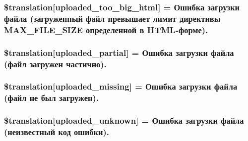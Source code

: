 \subsubsection[{\$translation}]{\setlength{\rightskip}{0pt plus 5cm}\$translation\mbox{[}\textquotesingle{}uploaded\+\_\+too\+\_\+big\+\_\+html\textquotesingle{}\mbox{]} = \textquotesingle{}Ошибка загрузки файла (загруженный файл превышает лимит директивы M\+A\+X\+\_\+\+F\+I\+L\+E\+\_\+\+S\+I\+Z\+E определенной в H\+T\+M\+L-\/форме).\textquotesingle{}}\label{class_8upload_8ru___r_u_8php_a623d5b8b92169f57d7e43458aa911cbb}
\hypertarget{class_8upload_8ru___r_u_8php_a967c17da21b0a2d3bd65cca3a9ca0ea8}{}
\subsubsection[{\$translation}]{\setlength{\rightskip}{0pt plus 5cm}\$translation\mbox{[}\textquotesingle{}uploaded\+\_\+partial\textquotesingle{}\mbox{]} = \textquotesingle{}Ошибка загрузки файла (файл загружен частично).\textquotesingle{}}\label{class_8upload_8ru___r_u_8php_a967c17da21b0a2d3bd65cca3a9ca0ea8}
\hypertarget{class_8upload_8ru___r_u_8php_a0cce433260be65f1f35853a6b4b8952b}{}
\subsubsection[{\$translation}]{\setlength{\rightskip}{0pt plus 5cm}\$translation\mbox{[}\textquotesingle{}uploaded\+\_\+missing\textquotesingle{}\mbox{]} = \textquotesingle{}Ошибка загрузки файла (файл не был загружен).\textquotesingle{}}\label{class_8upload_8ru___r_u_8php_a0cce433260be65f1f35853a6b4b8952b}
\hypertarget{class_8upload_8ru___r_u_8php_a4a9168e922b827e6a28b5db1c00774ca}{}
\subsubsection[{\$translation}]{\setlength{\rightskip}{0pt plus 5cm}\$translation\mbox{[}\textquotesingle{}uploaded\+\_\+unknown\textquotesingle{}\mbox{]} = \textquotesingle{}Ошибка загрузки файла (неизвестный код ошибки).\textquotesingle{}}\label{class_8upload_8ru___r_u_8php_a4a9168e922b827e6a28b5db1c00774ca}
\hypertarget{class_8upload_8ru___r_u_8php_a3afc377bd803683314f413a814243066}{}
